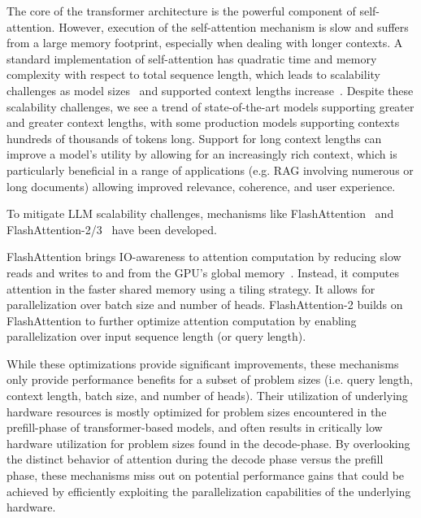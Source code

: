 The core of the transformer architecture is the powerful component of self-attention. However, execution of the self-attention mechanism is slow and suffers from a large memory footprint, especially when dealing with longer contexts. A standard implementation of self-attention has quadratic time and memory complexity with respect to total sequence length, which leads to scalability challenges as model sizes~\cite{brown2020language} and supported context lengths increase~\cite{claude3,zhang2024soaring,liu2023ring}. Despite these scalability challenges, we see a trend of state-of-the-art models supporting greater and greater context lengths, with some production models supporting contexts hundreds of thousands of tokens long. Support for long context lengths can improve a model's utility by allowing for an increasingly rich context, which is particularly beneficial in a range of applications (e.g. RAG involving numerous or long documents) allowing improved relevance, coherence, and user experience. 

To mitigate LLM scalability challenges, mechanisms like FlashAttention~\cite{dao2022flashattention} and FlashAttention-2/3~\cite{dao2023flashattention2, flashattention3} have been developed.

FlashAttention brings IO-awareness to attention computation by reducing slow reads and writes to and from the GPU's global memory~\cite{ivanov2021data}. Instead, it computes attention in the faster shared memory using a tiling strategy. It allows for parallelization over batch size and number of heads. FlashAttention-2 builds on FlashAttention to further optimize attention computation by enabling parallelization over input sequence length (or query length). 

While these optimizations provide significant improvements, these mechanisms only provide performance benefits for a subset of problem sizes (i.e. query length, context length, batch size, and number of heads). Their utilization of underlying hardware resources is mostly optimized for problem sizes encountered in the prefill-phase of transformer-based models, and often results in critically low hardware utilization for problem sizes found in the decode-phase. By overlooking the distinct behavior of attention during the decode phase versus the prefill phase, these mechanisms miss out on potential performance gains that could be achieved by efficiently exploiting the parallelization capabilities of the underlying hardware.

